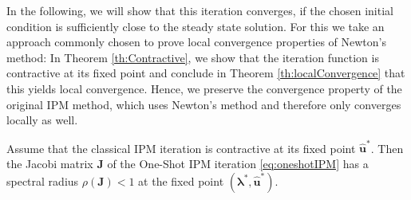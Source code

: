 In the following, we will show that this iteration converges, if the chosen initial condition is sufficiently close to the steady state solution. For this we take an approach commonly chosen to prove local convergence properties of Newton's method: In Theorem \ref{th:Contractive}, we show that the iteration function is contractive at its fixed point and conclude in Theorem \ref{th:localConvergence} that this yields local convergence. Hence, we preserve the convergence property of the original IPM method, which uses Newton's method and therefore only converges locally as well.
\begin{theorem}\label{th:Contractive}
Assume that the classical IPM iteration is contractive at its fixed point $\bm{\hat u}^*$. Then the Jacobi matrix $\bm{J}$ of the One-Shot IPM iteration \eqref{eq:oneshotIPM} has a spectral radius $\rho(\bm{J})<1$ at the fixed point $(\bm{\lambda}^*,\bm{\hat u}^*)$.
\end{theorem}
